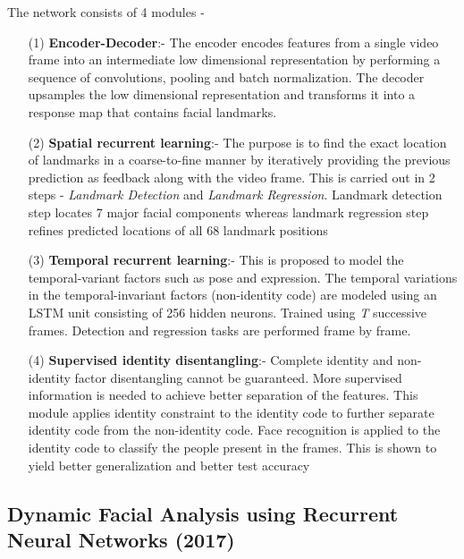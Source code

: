 \documentclass{llncs}
\begin{document}
The network consists of 4 modules -
\begin{itemize}
\item[(1)] \textbf{Encoder-Decoder}:-
The encoder encodes features from a single video frame into an intermediate low dimensional representation by performing a sequence of convolutions, pooling and batch normalization. The decoder upsamples the low dimensional representation and transforms it into a response map that contains facial landmarks.\\


\item[(2)] \textbf{Spatial recurrent learning}:-
The purpose is to find the exact location of landmarks in a coarse-to-fine manner by iteratively providing the previous prediction as feedback along with the video frame. This is carried out in 2 steps - \textit{Landmark Detection} and \textit{Landmark Regression}. Landmark detection step locates 7 major facial components whereas landmark regression step refines predicted locations of all 68 landmark positions\\

\item[(3)] \textbf{Temporal recurrent learning}:-
This is proposed to model the temporal-variant factors such as pose and expression. The temporal variations in the temporal-invariant factors (non-identity code) are modeled using an LSTM unit consisting of 256 hidden neurons.
Trained using \textit{T} successive frames. Detection and regression tasks are performed frame by frame. 
\\

\item[(4)] \textbf{Supervised identity disentangling}:-
Complete identity and non-identity factor disentangling cannot be guaranteed. More supervised information is needed to achieve better separation of the features. This module applies identity constraint to the identity code to further separate identity code from the non-identity code. Face recognition is applied to the identity code to classify the people present in the frames. This is shown to yield better generalization and better test accuracy\\
\end{itemize}
 

\subsection{Dynamic Facial Analysis using Recurrent Neural Networks (2017) \cite{dynamic_facial_analysis}}
\end{document}
